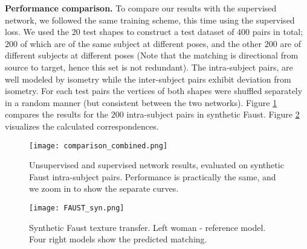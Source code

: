 \documentclass[10pt,twocolumn,letterpaper]{article}
\begin{document}
\vspace{1ex}\noindent\textbf{Performance comparison.}
To compare our results with the supervised network, we followed the same training scheme, this time using the supervised loss. We used the $20$ test shapes to construct a test dataset of $400$ pairs in total; $200$ of which are of the same subject at different poses, and the other $200$ are of different subjects at different poses (Note that the matching is directional from source to target, hence this set is not redundant). The intra-subject pairs, are well modeled by isometry while the inter-subject pairs exhibit deviation from isometry. For each test pairs the vertices of both shapes were shuffled separately in a random manner (but consistent between the two networks).  
Figure \ref{isocomp} compares the results for the $200$ intra-subject pairs in synthetic Faust. Figure \ref{synthetic_vis} visualizes the calculated correspondences.

\begin{figure}

    \texttt{[image: comparison\_combined.png]}
    \caption{\label{isocomp} Unsupervised and supervised network results, evaluated on synthetic Faust intra-subject pairs. Performance is practically the same, and we zoom in to show the separate curves.}
\end{figure}

\begin{figure}
    \texttt{[image: FAUST\_syn.png]}
    \caption{\label{synthetic_vis}Synthetic Faust texture transfer. Left woman - reference model. Four right models show the predicted matching.}
\end{figure}
\end{document}
